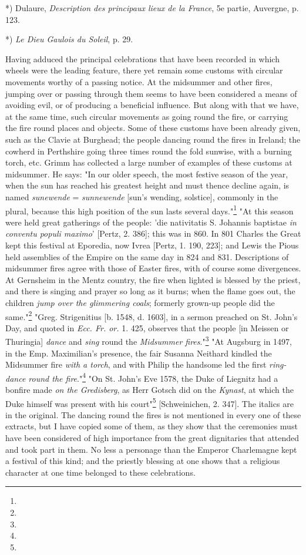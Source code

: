 \documentclass[a4paper, 11pt, oneside, polutonikogreek, english]{article}
\begin{document}
*) Dulaure, \emph{Description des principaux lieux de la France}, 5e partie, Auvergne, p. 123.

*) \emph{Le Dieu Gaulois du Soleil}, p. 29.

Having adduced the principal celebrations that have been recorded in which wheels were the leading feature, there yet remain some customs with circular movements worthy of a passing notice. At the midsummer and other fires, jumping over or passing through them seems to have been considered a means of avoiding evil, or of producing a beneficial influence. But along with that we have, at the same time, such circular movements as going round the fire, or carrying the fire round places and objects. Some of these customs have been already given, such as the Clavie at Burghead; the people dancing round the fires in Ireland; the cowherd in Perthshire going three times round the fold sunwise, with a burning torch, etc. Grimm has collected a large number of examples of these customs at midsummer. He says: "In our older speech, the most festive season of the year, when the sun has reached his greatest height and must thence decline again, is named \emph{sunewende} = \emph{sunnewende} [sun's wending, solstice], commonly in the plural, because this high position of the sun lasts several days."\footnote{} "At this season were held great gatherings of the people: 'die nativitatis S. Johannis baptistae \emph{in conventu populi maximo}' [Pertz, 2. 386]; this was in 860. In 801 Charles the Great kept this festival at Eporedia, now Ivrea [Pertz, 1. 190, 223]; and Lewis the Pious held assemblies of the Empire on the same day in 824 and 831. Descriptions of midsummer fires agree with those of Easter fires, with of course some divergences. At Gernsheim in the Mentz country, the fire when lighted is blessed by the priest, and there is singing and prayer so long as it burns; when the flame goes out, the children \emph{jump over the glimmering coals}; formerly grown-up people did the same."\footnote{} "Greg. Strigenitius [b. 1548, d. 1603], in a sermon preached on St. John's Day, and quoted in \emph{Ecc. Fr. or.} 1. 425, observes that the people [in Meissen or Thuringia] \emph{dance} and \emph{sing} round the \emph{Midsummer fires}."\footnote{} "At Augsburg in 1497, in the Emp. Maximilian's presence, the fair Susanna Neithard kindled the Midsummer fire \emph{with a torch}, and with Philip the handsome led the first \emph{ring-dance round the fire}."\footnote{} "On St. John's Eve 1578, the Duke of Liegnitz had a bonfire made \emph{on the Gredisberg}, as Herr Gotsch did on the \emph{Kynast}, at which the Duke himself was present with his court"\footnote{} [Schweinichen, 2. 347]. The italics are in the original. The dancing round the fires is not mentioned in every one of these extracts, but I have copied some of them, as they show that the ceremonies must have been considered of high importance from the great dignitaries that attended and took part in them. No less a personage than the Emperor Charlemagne kept a festival of this kind; and the priestly blessing at one shows that a religious character at one time belonged to these celebrations.
\end{document}
